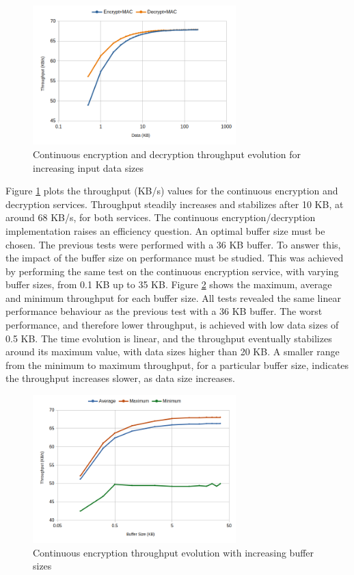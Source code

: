 \begin{figure}[h!]
	\centering
	\includegraphics[width=0.7\textwidth]{./Images/services-tput.png}
	\caption{Continuous encryption and decryption throughput evolution for increasing input data sizes}
	\label{fig:performance:services-tput}
\end{figure}

Figure \ref{fig:performance:services-tput} plots the throughput (KB/s) values for the continuous encryption and decryption services. Throughput steadily increases and stabilizes after 10 KB, at around 68 KB/s, for both services.
The continuous encryption/decryption implementation raises an efficiency question. An optimal buffer size must be chosen. The previous tests were performed with a 36 KB buffer.
To answer this, the impact of the buffer size on performance must be studied.
This was achieved by performing the same test on the continuous encryption service, with varying buffer sizes, from 0.1 KB up to 35 KB. Figure \ref{fig:performance:buffer-tput} shows the maximum, average and minimum throughput for each buffer size.
All tests revealed the same linear performance behaviour as the previous test with a 36 KB buffer. The worst performance, and therefore lower throughput, is achieved with low data sizes of 0.5 KB. The time evolution is linear, and the throughput eventually stabilizes around its maximum value, with data sizes higher than 20 KB.
A smaller range from the minimum to maximum throughput, for a particular buffer size, indicates the throughput increases slower, as data size increases.

\begin{figure}[h!]
	\centering
	\includegraphics[width=0.7\textwidth]{./Images/buffer-tput.png}
	\caption{Continuous encryption throughput evolution with increasing buffer sizes}
	\label{fig:performance:buffer-tput}
\end{figure}

